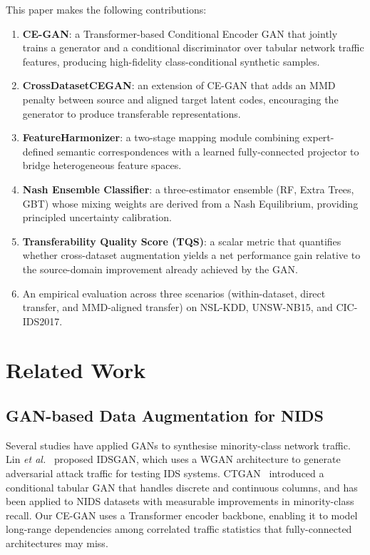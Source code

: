 \documentclass[conference]{IEEEtran}
\begin{document}
This paper makes the following contributions:
\begin{enumerate}
  \item \textbf{CE-GAN}: a Transformer-based Conditional Encoder GAN that
    jointly trains a generator and a conditional discriminator over tabular
    network traffic features, producing high-fidelity class-conditional
    synthetic samples.
  \item \textbf{CrossDatasetCEGAN}: an extension of CE-GAN that adds an
    MMD penalty between source and aligned target latent codes, encouraging
    the generator to produce transferable representations.
  \item \textbf{FeatureHarmonizer}: a two-stage mapping module combining
    expert-defined semantic correspondences with a learned fully-connected
    projector to bridge heterogeneous feature spaces.
  \item \textbf{Nash Ensemble Classifier}: a three-estimator ensemble
    (RF, Extra Trees, GBT) whose mixing weights are derived from a
    Nash Equilibrium, providing principled uncertainty calibration.
  \item \textbf{Transferability Quality Score (TQS)}: a scalar metric
    that quantifies whether cross-dataset augmentation yields a net
    performance gain relative to the source-domain improvement already
    achieved by the GAN.
  \item An empirical evaluation across three scenarios (within-dataset,
    direct transfer, and MMD-aligned transfer) on NSL-KDD, UNSW-NB15,
    and CIC-IDS2017.
\end{enumerate}

\section{Related Work}

\subsection{GAN-based Data Augmentation for NIDS}
Several studies have applied GANs to synthesise minority-class network traffic.
Lin \emph{et al.}~\cite{lin2018idsgan} proposed IDSGAN, which uses a WGAN
architecture to generate adversarial attack traffic for testing IDS systems.
CTGAN~\cite{xu2019modeling} introduced a conditional tabular GAN that
handles discrete and continuous columns, and has been applied to
NIDS datasets with measurable improvements in minority-class recall.
Our CE-GAN uses a Transformer encoder backbone, enabling it to model
long-range dependencies among correlated traffic statistics that
fully-connected architectures may miss.
\end{document}
